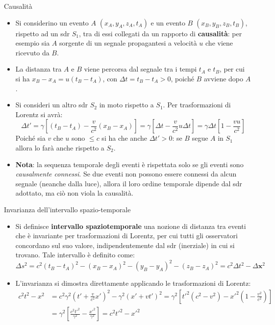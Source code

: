 \documentclass[a4_2,grid,frame]{flashcards}
\newenvironment{cartaflash}
    {\vspace{-15pt}
    \begin{itemize}
    }
    {
    \end{itemize}
    }
\begin{document}
\begin{flashcard}[Conseguenza]{Causalità}
\begin{cartaflash}
\item Si considerino un evento $A$ $(x_A, y_A, z_A, t_A)$ e un evento $B$ $(x_B, y_B, z_B, t_B)$, rispetto ad un sdr $S_1$, tra di essi collegati da un rapporto di \textbf{causalità}: per esempio sia $A$ sorgente di un segnale propagantesi a velocità $u$ che viene ricevuto da $B$. 
\item La distanza tra $A$ e $B$ viene percorsa dal segnale tra i tempi $t_A$ e $t_B$, per cui si ha $x_B - x_A = u(t_B - t_A)$, con $\Delta t = t_B-t_A > 0$, poiché $B$ avviene dopo $A$.
\item Si consideri un altro sdr $S_2$ in moto rispetto a $S_1$. Per trasformazioni di Lorentz si avrà:
\[
\Delta t' = \gamma \left [(t_B-t_A)-\frac{v}{c^2}(x_B -x_A) \right ] = \gamma \left [\Delta t - \frac{v}{c^2}u\Delta t \right ] = \gamma \Delta t \left [ 1- \frac{vu}{c^2} \right ]
\]
Poiché sia $v$ che $u$ sono $\leq c$ si ha che anche $\Delta t'>0$: se $B$ segue $A$ in $S_1$ allora lo farà anche rispetto a $S_2$.
\item \textbf{Nota}: la sequenza temporale degli eventi è rispettata solo se gli eventi sono \textit{causalmente connessi}. Se due eventi non possono essere connessi da alcun segnale (neanche dalla luce), allora il loro ordine temporale dipende dal sdr adottato, ma ciò non viola la causalità.
\end{cartaflash}
\end{flashcard}

\begin{flashcard}[Definizione]{Invarianza dell'intervallo spazio-temporale}
\begin{cartaflash}
\item Si definisce \textbf{intervallo spaziotemporale} una nozione di distanza tra eventi che è invariante per trasformazioni di Lorentz, per cui tutti gli osservatori concordano sul suo valore, indipendentemente dal sdr (inerziale) in cui si trovano. Tale intervallo è definito come:
\[
\Delta s^2 = c^2 (t_B-t_A)^2 - (x_B-x_A)^2 - (y_B-y_A)^2 - (z_B - z_A)^2 = c^2 \Delta t^2 - \Delta\bm{x}^2
\]
\item L'invarianza si dimostra direttamente applicando le trasformazioni di Lorentz:
{
\begin{align*}
    c^2t^2 - x^2 &= c^2 \gamma^2 \left ( t' + \frac{v}{c^2}x'\right )^2  - \gamma^2(x'+vt')^2 = \gamma^2 \left [ t'^2 (c^2-v^2) - x'^2 \left (1 - \frac{v^2}{c^2} \right ) \right ] \\
    &= \gamma^2 \left [\frac{c^2 t'^2}{\gamma^2} - \frac{x'^2}{\gamma^2} \right ] = c^2 t'^2 - x'^2 %
\end{align*}
}
\end{cartaflash}
\end{flashcard}
\end{document}
